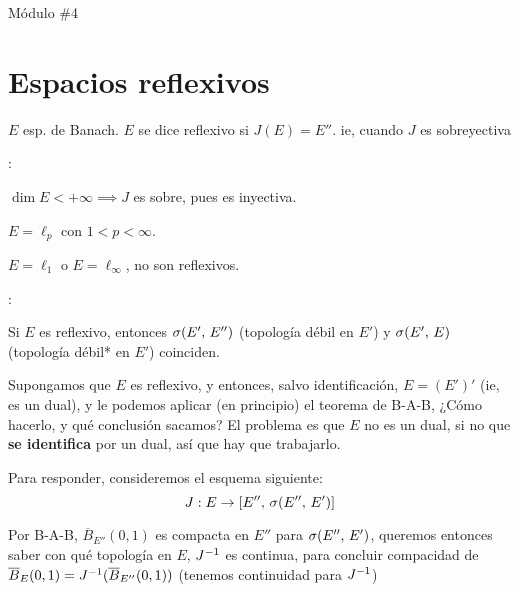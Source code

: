Módulo \#4

\section{Espacios reflexivos}

\begin{defn}
$E$ esp. de Banach. $E$ se dice reflexivo si $J(E) = E''$. ie, cuando $J$ es sobreyectiva
\end{defn}

\begin{ex}:\\
\begin{ienumerate}
    \item $\dim E < + \infty \implies J$ es sobre, pues es inyectiva.
    \item $E = \ell_p$ con $1 < p < \infty$.
    \item $E = \ell_1$ o $E = \ell_\infty$, no son reflexivos.
\end{ienumerate}
\end{ex}

\begin{note}:\\
\begin{ienumerate}
    \item Si $E$ es reflexivo, entonces $\sigma(E',\, E'')$ (topología débil en $E'$) y $\sigma(E',\, E)$ (topología débil* en $E'$) coinciden.
    
    \item Supongamos que $E$ es reflexivo, y entonces, salvo identificación, $E = (E')'$ (ie, es un dual), y le podemos aplicar (en principio) el teorema de B-A-B, ¿Cómo hacerlo, y qué conclusión sacamos? El problema es que $E$ no es un dual, si no que \textbf{se identifica} por un dual, así que hay que trabajarlo.
    
\end{ienumerate}

\end{note}

Para responder, consideremos el esquema siguiente:
\begin{equation*}
    J: E \to [E'',\, \sigma(E'',\, E')]
\end{equation*}

Por B-A-B, $\overline{B}_{E''}(0,1)$ es compacta en $E''$ para $\sigma(E'',\, E')$, queremos entonces saber con qué topología en $E$, $J^{-1}$ es continua, para concluir compacidad de $\overline{B}_{E}(0,1) = J^{-1} (\overline{B}_{E''}(0,1))$ (tenemos continuidad para $J^{-1}$)

